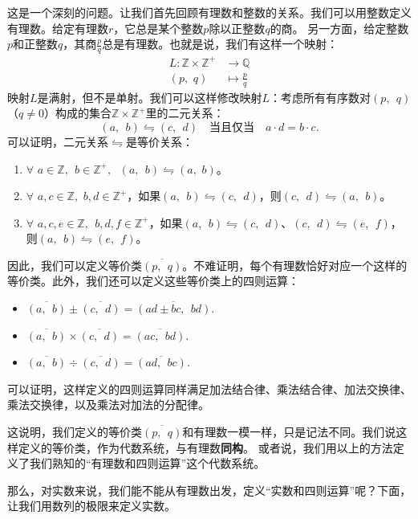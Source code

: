 \documentclass[12pt,UTF8]{ctexbook}
\begin{document}
这是一个深刻的问题。让我们首先回顾有理数和整数的关系。我们可以用整数定义有理数。给定有理数$r$，它总是某个整数$p$除以正整数$q$的商。
另一方面，给定整数$p$和正整数$q$，其商$\frac{p}{q}$总是有理数。也就是说，我们有这样一个映射：
\begin{align*}
    L: \mathbb{Z} \times \mathbb{Z}^+ &\rightarrow \mathbb{Q}  \\
    (p, \,\, q) &\mapsto \frac{p}{q} 
\end{align*}
映射$L$是满射，但不是单射。我们可以这样修改映射$L$：考虑所有有序数对$(p, \;\, q)$（$q\neq 0$）构成的集合$\mathbb{Z} \times \mathbb{Z}^+$里的二元关系：
$$ (a,\;\, b) \leftrightharpoons (c, \;\, d)\quad \mbox{当且仅当} \quad a\cdot d = b \cdot c.$$
可以证明，二元关系$\leftrightharpoons$是等价关系：
\begin{enumerate}
    \item $\forall \,\, a\in \mathbb{Z}, \;\, b\in\mathbb{Z}^+, \;\,\, (a,\;\, b) \leftrightharpoons (a, \,\, b)$。
    \item $\forall \,\, a,c\in \mathbb{Z}, \,\, b,d\in\mathbb{Z}^+$，如果$(a,\;\, b) \leftrightharpoons (c, \;\, d)$，则$ (c, \;\, d)\leftrightharpoons (a,\;\, b)$。
    \item $\forall \,\, a,c,e\in \mathbb{Z}, \;\, b,d,f\in\mathbb{Z}^+$，如果$(a,\;\, b) \leftrightharpoons (c, \;\, d)$、$ (c, \;\, d)\leftrightharpoons (e,\;\, f)$，则$(a,\;\, b) \leftrightharpoons (e,\;\, f)$。
\end{enumerate}
因此，我们可以定义等价类$\overline{(p,\;\, q)}$。不难证明，每个有理数恰好对应一个这样的等价类。此外，我们还可以定义这些等价类上的四则运算：
\begin{itemize}
    \item $\overline{(a,\;\, b)} \pm \overline{(c, \;\, d)} = \overline{(ad \pm bc, \;\, bd)}.$
    \item $\overline{(a,\;\, b)} \times \overline{(c, \;\, d)} = \overline{(ac, \;\, bd)}.$
    \item $\overline{(a,\;\, b)} \div \overline{(c, \;\, d)} = \overline{(ad, \;\,bc)}.$
\end{itemize}
可以证明，这样定义的四则运算同样满足加法结合律、乘法结合律、加法交换律、乘法交换律，以及乘法对加法的分配律。

这说明，我们定义的等价类$\overline{(p,\;\, q)}$和有理数一模一样，只是记法不同。我们说这样定义的等价类，作为代数系统，与有理数\textbf{同构}。
或者说，我们用以上的方法定义了我们熟知的“有理数和四则运算”这个代数系统。

那么，对实数来说，我们能不能从有理数出发，定义“实数和四则运算”呢？下面，让我们用数列的极限来定义实数。
\end{document}
